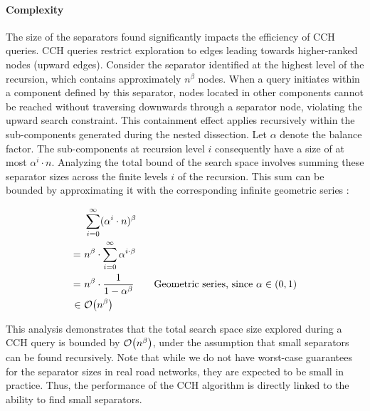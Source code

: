 \paragraph{Complexity}

The size of the separators found significantly impacts the efficiency of CCH queries.
CCH queries restrict exploration to edges leading towards higher-ranked nodes (upward edges).
Consider the separator identified at the highest level of the recursion, which contains approximately \(n^\beta\) nodes.
When a query initiates within a component defined by this separator, nodes located in other components cannot be reached without traversing downwards through a separator node, violating the upward search constraint.
This containment effect applies recursively within the sub-components generated during the nested dissection.
Let \(\alpha\) denote the balance factor.
The sub-components at recursion level \(i\) consequently have a size of at most \( \alpha^i \cdot n \).
Analyzing the total bound of the search space involves summing these separator sizes across the finite levels \(i\) of the recursion.
This sum can be bounded by approximating it with the corresponding infinite geometric series \cite{bauer_search-space_2016}:

\begin{align*}
	    & ~\sum_{i=0}^{\infty} (\alpha^i\cdot n)^\beta                                                         \\
	=   & ~n^\beta \cdot \sum_{i=0}^{\infty} \alpha^{i\cdot \beta}                                             \\
	=   & ~n^\beta \cdot \frac{1}{1 - \alpha^\beta} \qquad \text{Geometric series, since \(\alpha \in (0,1)\)} \\
	\in & ~\mathcal{O}\!\left(n^\beta\right)
\end{align*}

This analysis demonstrates that the total search space size explored during a CCH query is bounded by \(\mathcal{O}\!\left(n^\beta\right)\), under the assumption that small separators can be found recursively.
Note that while we do not have worst-case guarantees for the separator sizes in real road networks, they are expected to be small in practice.
Thus, the performance of the CCH algorithm is directly linked to the ability to find small separators.
